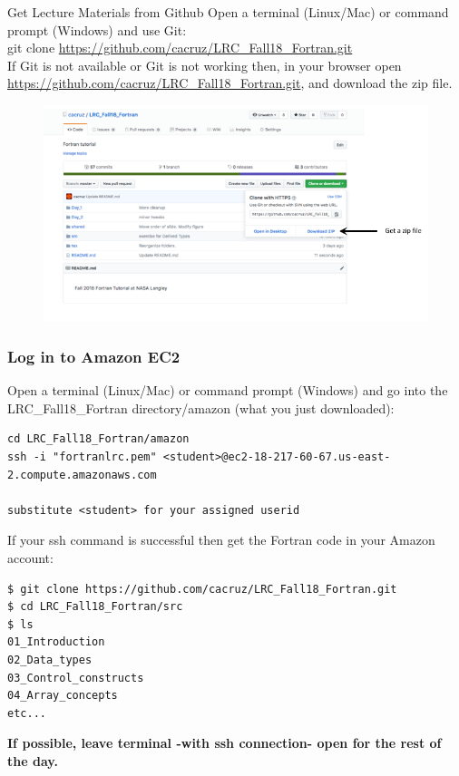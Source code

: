 \documentclass[11pt]{beamer}
\begin{document}
\begin{frame}{Get Lecture Materials from Github}
\footnotesize{Open a terminal (Linux/Mac) or command prompt (Windows) and use Git:\\}
\footnotesize{\quad git clone \url{https://github.com/cacruz/LRC_Fall18_Fortran.git}}\\
\vspace{5mm}
If Git is not available or Git is not working then, in your browser open \url{https://github.com/cacruz/LRC_Fall18_Fortran.git}, and download the zip file.
\begin{figure}[t]
\centering
\includegraphics[scale=.25]{../../shared/github_zip}
\end{figure}

\end{frame}


\begin{frame}[fragile]
\frametitle{Log in to Amazon EC2}

\footnotesize{Open a terminal (Linux/Mac) or command prompt (Windows) and go into the LRC\_Fall18\_Fortran directory/amazon (what you just downloaded):}

\tiny{
\begin{Verbatim} 
cd LRC_Fall18_Fortran/amazon
ssh -i "fortranlrc.pem" <student>@ec2-18-217-60-67.us-east-2.compute.amazonaws.com

substitute <student> for your assigned userid
\end{Verbatim}
}
\footnotesize{If your ssh command is successful then get the Fortran code in your Amazon account:}
\scriptsize{
\begin{Verbatim} 
$ git clone https://github.com/cacruz/LRC_Fall18_Fortran.git
$ cd LRC_Fall18_Fortran/src
$ ls
01_Introduction
02_Data_types
03_Control_constructs
04_Array_concepts
etc...
\end{Verbatim}
}
\begin{center}
\textbf{If possible, leave terminal -with ssh connection- open for the rest of the day.}
\end{center}
\end{frame}
\end{document}
